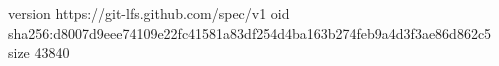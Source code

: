 version https://git-lfs.github.com/spec/v1
oid sha256:d8007d9eee74109e22fc41581a83df254d4ba163b274feb9a4d3f3ae86d862c5
size 43840

